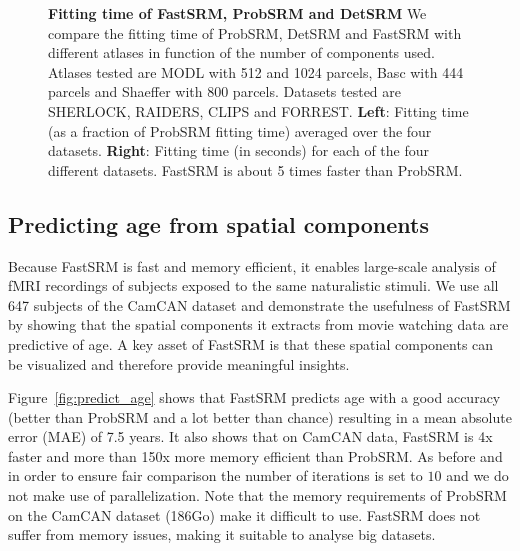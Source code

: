\documentclass{report}
\begin{document}
{\begin{figure}
\caption{\textbf{Fitting time of FastSRM, ProbSRM and DetSRM} We compare the fitting time of ProbSRM, DetSRM and FastSRM with different atlases in function of the number of components used. Atlases tested are MODL with 512 and 1024 parcels, Basc with 444 parcels and Shaeffer with 800 parcels. Datasets tested are SHERLOCK, RAIDERS, CLIPS and FORREST.
\textbf{Left}: Fitting time (as a fraction of ProbSRM fitting time) averaged over the four datasets.
\textbf{Right}: Fitting time (in seconds) for each of the four different datasets.
FastSRM is about 5 times faster than ProbSRM.}
\label{fig:fit_time}
\end{figure}

\subsection{Predicting age from spatial components}
Because FastSRM is fast and memory efficient, it enables large-scale analysis of fMRI recordings of subjects exposed to the same naturalistic stimuli.
%
We use all 647 subjects of the CamCAN dataset and demonstrate the usefulness of FastSRM by showing that the spatial components it extracts from movie watching data are predictive of age.
%
A key asset of FastSRM is that these spatial components can be visualized and therefore provide meaningful insights. 

Figure~\ref{fig:predict_age} shows that FastSRM predicts age with a good accuracy (better than ProbSRM and a lot better than chance) resulting in a mean absolute error (MAE) of 7.5 years.
%
It also shows that on CamCAN data, FastSRM is 4x faster and more than 150x more memory efficient than ProbSRM. As before and in order to ensure fair comparison the number of iterations is set to $10$ and we do not make use of parallelization. Note that the memory requirements of ProbSRM on the CamCAN dataset (186Go) make it difficult to use.
%
FastSRM does not suffer from memory issues, making it suitable to analyse big datasets.

}
\end{document}
